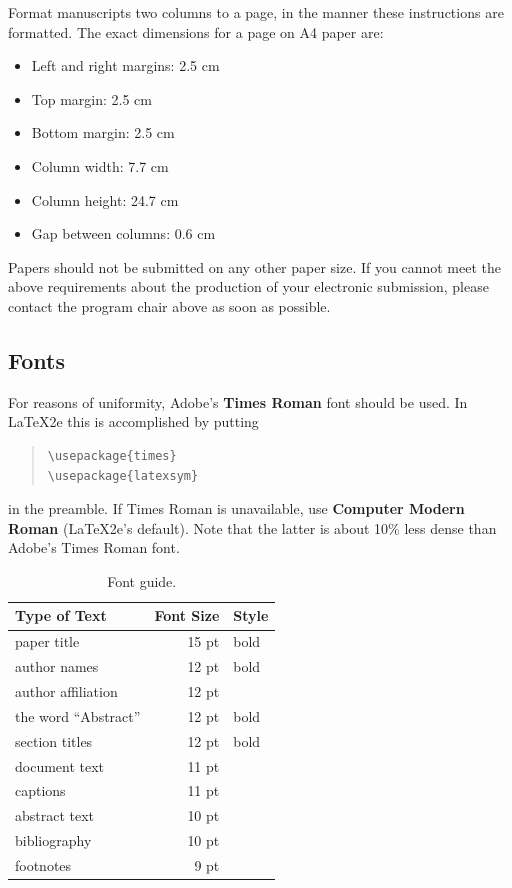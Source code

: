 \documentclass[11pt]{article}
\begin{document}
Format manuscripts two columns to a page, in the manner these
instructions are formatted. The exact dimensions for a page on A4
paper are:

\begin{itemize}
\item Left and right margins: 2.5 cm
\item Top margin: 2.5 cm
\item Bottom margin: 2.5 cm
\item Column width: 7.7 cm
\item Column height: 24.7 cm
\item Gap between columns: 0.6 cm
\end{itemize}

\noindent Papers should not be submitted on any other paper size.
 If you cannot meet the above requirements about the production of your electronic submission, 
please contact the program chair above as soon as possible.

\subsection{Fonts}
\label{ssec:fonts}
For reasons of uniformity, Adobe's {\bf Times Roman} font should be
used. In \LaTeX2e{} this is accomplished by putting

\begin{quote}
\begin{verbatim}
\usepackage{times}
\usepackage{latexsym}
\end{verbatim}
\end{quote}
in the preamble. If Times Roman is unavailable, use {\bf Computer
  Modern Roman} (\LaTeX2e{}'s default).  Note that the latter is about
  10\% less dense than Adobe's Times Roman font.


\begin{table}
\begin{center}
\begin{tabular}{|l|rl|}
\hline \bf Type of Text & \bf Font Size & \bf Style \\ \hline
paper title & 15 pt & bold \\
author names & 12 pt & bold \\
author affiliation & 12 pt & \\
the word ``Abstract'' & 12 pt & bold \\
section titles & 12 pt & bold \\
document text & 11 pt  &\\
captions & 11 pt & \\
abstract text & 10 pt & \\
bibliography & 10 pt & \\
footnotes & 9 pt & \\
\hline
\end{tabular}
\end{center}
\caption{\label{font-table} Font guide. }
\end{table}
\end{document}
